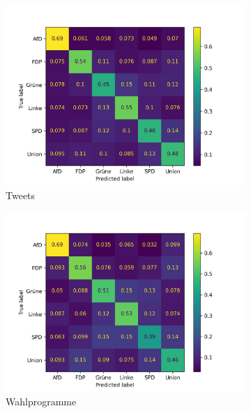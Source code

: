 \begin{figure}[H]
  \centering
  \begin{subfigure}{0.49\textwidth}
    \includegraphics[width=\textwidth]{data/images/modeling/baseline/under/tweets_confusion_matrix.png}
    \caption{Tweets}
    \label{sfig:confusionMatrixBaselineTweets}
  \end{subfigure}
  \hfill
  \begin{subfigure}{0.49\textwidth}
    \includegraphics[width=\textwidth]{data/images/modeling/baseline/under/party_programs_confusion_matrix.png}
    \caption{Wahlprogramme}
    \label{sfig:confusionMatrixBaselineManifest}
  \end{subfigure}
  \hfill
  \begin{subfigure}{0.49\textwidth}

\end{subfigure}
\end{figure}
